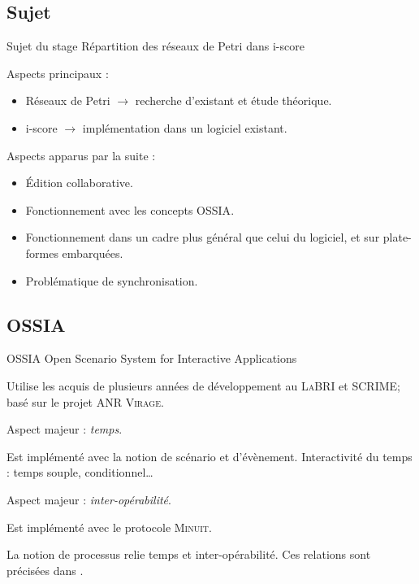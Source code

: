 \subsection{Sujet}
\begin{frame}{Sujet du stage}
	{\large Répartition des réseaux de Petri dans i-score}
	
	Aspects principaux : 
	\begin{itemize}
		\item Réseaux de Petri $\rightarrow$ recherche d'existant et étude théorique.
		\item i-score $\rightarrow$ implémentation dans un logiciel existant.
	\end{itemize} 
	\vspace{1em}
	Aspects apparus par la suite : 
	\begin{itemize}
		\item Édition collaborative.
		\item Fonctionnement avec les concepts {OSSIA}.
		\item Fonctionnement dans un cadre plus général que celui du logiciel, et sur plate-formes embarquées.
		\item Problématique de synchronisation.
	\end{itemize}
	
\end{frame}

\subsection{OSSIA}
\begin{frame}{OSSIA}
	{\large Open Scenario System for Interactive Applications}
	
	Utilise les acquis de plusieurs années de développement au \textsc{LaBRI} et \textsc{SCRIME}; basé sur le projet \textsc{ANR Virage}.
	
	\vspace{1em}
	Aspect majeur : \emph{temps}.
	\begin{itemize}
		\itemar Est implémenté avec la notion de scénario et d'évènement.
		\itemar Interactivité du temps : temps souple, conditionnel\dots
	\end{itemize}
	
	Aspect majeur : \emph{inter-opérabilité}.
	\begin{itemize}
		\itemar Est implémenté avec le protocole \textsc{Minuit}.
	\end{itemize}
		
	La notion de processus relie temps et inter-opérabilité. Ces relations sont précisées dans \cite{hogue2014ossia}.
\end{frame}

